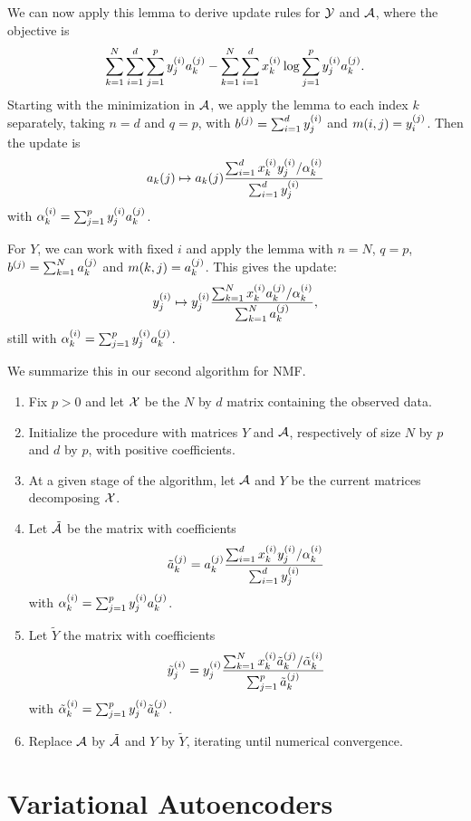 We can now apply this lemma to derive update rules for ${\mathcal Y}$ and ${\mathcal A}$, where the objective is
\[
\sum_{k=1}^N \sum_{i=1}^d \sum_{j=1}^p y_j^{(i)} a_k^{(j)} - \sum_{k=1}^N\sum_{i=1}^d x_k^{(i)} \log\sum_{j=1}^p y_j^{(i)} a_k^{(j)}.
\]
Starting with the minimization in ${\mathcal A}$, we  apply the lemma to each  index $k$ separately,  taking $n=d$ and $q=p$, with $b^{(j)} = \sum_{i=1}^d y_j^{(i)}$  and $m(i,j) = y_i^{(j)}$. 
 Then the update is 
\[
a_k(j) \mapsto a_k(j) \frac{\sum_{i=1}^d x_k^{(i)} y_j^{(i)}/\alpha_k^{(i)}}{\sum_{i=1}^d y_j^{(i)}}
\]
with $\alpha_k^{(i)} = \sum_{j=1}^p y_j^{(i)} a_k^{(j)}$.


For $Y$, we can work with fixed $i$ and apply the lemma with $n=N$, $q=p$, $b^{(j)} = \sum_{k=1}^N a_k^{(j)}$ and $m(k,j) = a_k^{(j)}$. 
 This gives the update:
\[
y_j^{(i)} \mapsto y_j^{(i)}  \frac{\sum_{k=1}^N x_k^{(i)} a_k^{(j)}/\alpha_k^{(i)}}{\sum_{k=1}^N a_k^{(j)}},
\]
still with $\alpha_k^{(i)} = \sum_{j=1}^p y_j^{(i)} a_k^{(j)}$.

We summarize this in our second algorithm for NMF.
\begin{algorithm}
\label{alg:nmf.log}
\begin{enumerate}[label=\arabic*., wide=0.5cm]
\item Fix $p>0$ and let ${\mathcal X}$ be the $N$ by $d$ matrix containing the observed data. 
\item Initialize the procedure with matrices $Y$ and ${\mathcal A}$, respectively of size $N$ by $p$ and $d$ by $p$, with positive coefficients.
\item
At a given stage of the algorithm, let ${\mathcal A}$ and $Y$ be the current matrices decomposing ${\mathcal X}$. 
\item Let $\tilde{{\mathcal A}}$ be the matrix with coefficients
\[
\tilde a_k^{(j)} = a_k^{(j)} \frac{\sum_{i=1}^d x_k^{(i)} y_j^{(i)}/\alpha_k^{(i)}}{\sum_{i=1}^d y_j^{(i)}}
\]
with $\alpha_k^{(i)} = \sum_{j=1}^p y_j^{(i)} a_k^{(j)}$.
\item Let $\tilde Y$ the matrix with coefficients
\[
\tilde y_j^{(i)} = y_j^{(i)} \frac{\sum_{k=1}^N x_k^{(i)} \tilde a_k^{(j)}/\tilde {\alpha}_k^{(i)}}{\sum_{j=1}^p \tilde a_k^{(j)}}
\]
with $\tilde {\alpha}_k^{(i)} = \sum_{j=1}^p y_j^{(i)} \tilde a_k^{(j)}$.
\item Replace ${\mathcal A}$ by $\tilde {{\mathcal A}}$ and $Y$ by $\tilde Y$, iterating until numerical convergence.
\end{enumerate}
\end{algorithm}


\section{Variational Autoencoders}
\label{sec:vae.2}

